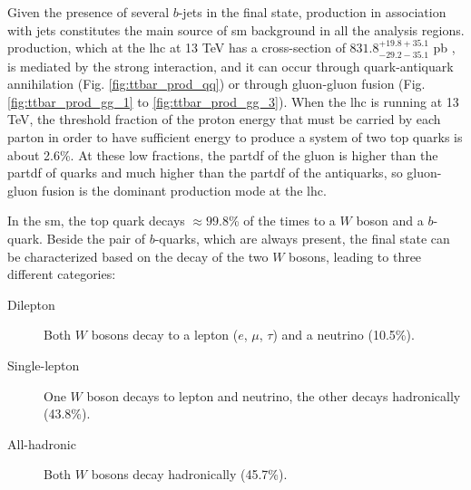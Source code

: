 Given the presence of several $b$-jets in the final state, \ttbar production in association with jets constitutes the main source of \gls{sm} background in all the analysis regions. \ttbar production, which at the \gls{lhc} at 13 TeV has a cross-section of $831.8^{+19.8 + 35.1}_{-29.2-35.1}$ pb \cite{Czakon:2013goa}, is mediated by the strong interaction, and it can occur through quark-antiquark annihilation (Fig. \ref{fig:ttbar_prod_qq}) or through gluon-gluon fusion (Fig. \ref{fig:ttbar_prod_gg_1} to \ref{fig:ttbar_prod_gg_3}). When the \gls{lhc} is running at 13 TeV, the threshold fraction of the proton energy that must be carried by each parton in order to have sufficient energy to produce a system of two top quarks 
is about 2.6\%.
At these low fractions, the \gls{partdf} of the gluon is higher than the \gls{partdf} of quarks and much higher than the \gls{partdf} of the antiquarks, so gluon-gluon fusion is the dominant \ttbar production mode at the \gls{lhc}.


In the \gls{sm}, the top quark decays $\approx 99.8$\% of the times to a $W$ boson and a $b$-quark. 
Beside the pair of $b$-quarks, which are always present, the final state can be characterized based on the decay of the two $W$ bosons, leading to three different categories:
\begin{description}
\item[Dilepton]  Both $W$ bosons decay to a lepton ($e$, $\mu$, $\tau$) and a neutrino (10.5\%).
\item[Single-lepton] One $W$ boson decays to lepton and neutrino, the other decays hadronically (43.8\%).
\item[All-hadronic] Both $W$ bosons decay hadronically (45.7\%).
\end{description}

